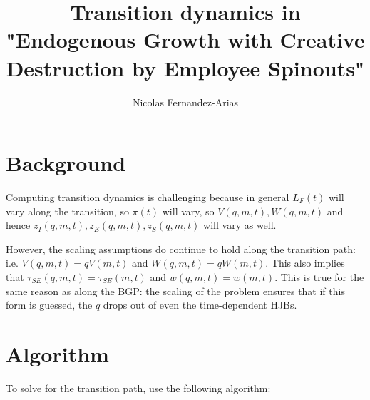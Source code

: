 \documentclass[10pt,english]{article}
\theoremstyle{remark}
\begin{document}
	
	
\title{Transition dynamics in "Endogenous Growth with Creative Destruction by Employee Spinouts"}
\author{Nicolas Fernandez-Arias}
\maketitle

\section{Background}

Computing transition dynamics is challenging because in general $L_F(t)$ will vary along the transition, so $\pi(t)$ will vary, so $V(q,m,t),W(q,m,t)$ and hence $z_I(q,m,t),z_E(q,m,t),z_S(q,m,t)$ will vary as well. 

However, the scaling assumptions do continue to hold along the transition path: i.e. $V(q,m,t) = qV(m,t)$ and $W(q,m,t) = qW(m,t)$. This also implies that $\tau_{SE}(q,m,t) = \tau_{SE}(m,t)$ and $w(q,m,t) = w(m,t)$. This is true for the same reason as along the BGP: the scaling of the problem ensures that if this form is guessed, the $q$ drops out of even the time-dependent HJBs. 

\section{Algorithm}

To solve for the transition path, use the following algorithm:
\end{document}
